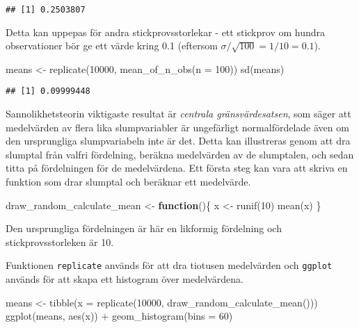 \documentclass[
]{book}
\newenvironment{Shaded}{\begin{snugshade}}{\end{snugshade}}
\newcommand{\AttributeTok}[1]{\textcolor[rgb]{0.77,0.63,0.00}{#1}}
\newcommand{\ControlFlowTok}[1]{\textcolor[rgb]{0.13,0.29,0.53}{\textbf{#1}}}
\newcommand{\DecValTok}[1]{\textcolor[rgb]{0.00,0.00,0.81}{#1}}
\newcommand{\FunctionTok}[1]{\textcolor[rgb]{0.00,0.00,0.00}{#1}}
\newcommand{\NormalTok}[1]{#1}
\newcommand{\OtherTok}[1]{\textcolor[rgb]{0.56,0.35,0.01}{#1}}
\newcommand{\SpecialCharTok}[1]{\textcolor[rgb]{0.00,0.00,0.00}{#1}}
\theoremstyle{definition}
\theoremstyle{definition}
\theoremstyle{definition}
\theoremstyle{definition}
\theoremstyle{remark}
\begin{document}
\begin{verbatim}
## [1] 0.2503807
\end{verbatim}

Detta kan uppepas för andra stickprovsstorlekar - ett stickprov om hundra observationer bör ge ett värde kring 0.1 (eftersom \(\sigma / \sqrt{100} = 1 / 10 = 0.1\)).

\begin{Shaded}
\begin{Highlighting}[]
\NormalTok{means }\OtherTok{\textless{}{-}} \FunctionTok{replicate}\NormalTok{(}\DecValTok{10000}\NormalTok{, }\FunctionTok{mean\_of\_n\_obs}\NormalTok{(}\AttributeTok{n =} \DecValTok{100}\NormalTok{))}
\FunctionTok{sd}\NormalTok{(means)}
\end{Highlighting}
\end{Shaded}

\begin{verbatim}
## [1] 0.09999448
\end{verbatim}

Sannolikhetsteorin viktigaste resultat är \emph{centrala gränsvärdesatsen}, som säger att medelvärden av flera lika slumpvariabler är ungefärligt normalfördelade även om den ursprungliga slumpvariabeln inte är det. Detta kan illustreras genom att dra slumptal från valfri fördelning, beräkna medelvärden av de slumptalen, och sedan titta på fördelningen för de medelvärdena. Ett första steg kan vara att skriva en funktion som drar slumptal och beräknar ett medelvärde.

\begin{Shaded}
\begin{Highlighting}[]
\NormalTok{draw\_random\_calculate\_mean }\OtherTok{\textless{}{-}} \ControlFlowTok{function}\NormalTok{()\{}
\NormalTok{  x }\OtherTok{\textless{}{-}} \FunctionTok{runif}\NormalTok{(}\DecValTok{10}\NormalTok{)}
  \FunctionTok{mean}\NormalTok{(x)}
\NormalTok{\}}
\end{Highlighting}
\end{Shaded}

Den ursprungliga fördelningen är här en likformig fördelning och stickprovsstorleken är 10.

Funktionen \texttt{replicate} används för att dra tiotusen medelvärden och \texttt{ggplot} används för att skapa ett histogram över medelvärdena.

\begin{Shaded}
\begin{Highlighting}[]
\NormalTok{means }\OtherTok{\textless{}{-}} \FunctionTok{tibble}\NormalTok{(}\AttributeTok{x =} \FunctionTok{replicate}\NormalTok{(}\DecValTok{10000}\NormalTok{, }\FunctionTok{draw\_random\_calculate\_mean}\NormalTok{()))}
\FunctionTok{ggplot}\NormalTok{(means, }\FunctionTok{aes}\NormalTok{(x)) }\SpecialCharTok{+}
  \FunctionTok{geom\_histogram}\NormalTok{(}\AttributeTok{bins =} \DecValTok{60}\NormalTok{)}
\end{Highlighting}
\end{Shaded}
\end{document}
